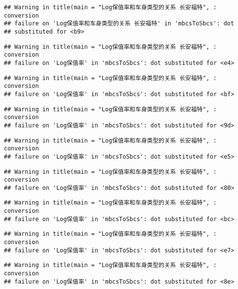 \documentclass[]{article}
\begin{document}
\begin{verbatim}
## Warning in title(main = "Log保值率和车身类型的关系 长安福特", : conversion
## failure on 'Log保值率和车身类型的关系 长安福特' in 'mbcsToSbcs': dot
## substituted for <b9>
\end{verbatim}

\begin{verbatim}
## Warning in title(main = "Log保值率和车身类型的关系 长安福特", : conversion
## failure on 'Log保值率' in 'mbcsToSbcs': dot substituted for <e4>
\end{verbatim}

\begin{verbatim}
## Warning in title(main = "Log保值率和车身类型的关系 长安福特", : conversion
## failure on 'Log保值率' in 'mbcsToSbcs': dot substituted for <bf>
\end{verbatim}

\begin{verbatim}
## Warning in title(main = "Log保值率和车身类型的关系 长安福特", : conversion
## failure on 'Log保值率' in 'mbcsToSbcs': dot substituted for <9d>
\end{verbatim}

\begin{verbatim}
## Warning in title(main = "Log保值率和车身类型的关系 长安福特", : conversion
## failure on 'Log保值率' in 'mbcsToSbcs': dot substituted for <e5>
\end{verbatim}

\begin{verbatim}
## Warning in title(main = "Log保值率和车身类型的关系 长安福特", : conversion
## failure on 'Log保值率' in 'mbcsToSbcs': dot substituted for <80>
\end{verbatim}

\begin{verbatim}
## Warning in title(main = "Log保值率和车身类型的关系 长安福特", : conversion
## failure on 'Log保值率' in 'mbcsToSbcs': dot substituted for <bc>
\end{verbatim}

\begin{verbatim}
## Warning in title(main = "Log保值率和车身类型的关系 长安福特", : conversion
## failure on 'Log保值率' in 'mbcsToSbcs': dot substituted for <e7>
\end{verbatim}

\begin{verbatim}
## Warning in title(main = "Log保值率和车身类型的关系 长安福特", : conversion
## failure on 'Log保值率' in 'mbcsToSbcs': dot substituted for <8e>
\end{verbatim}
\end{document}

